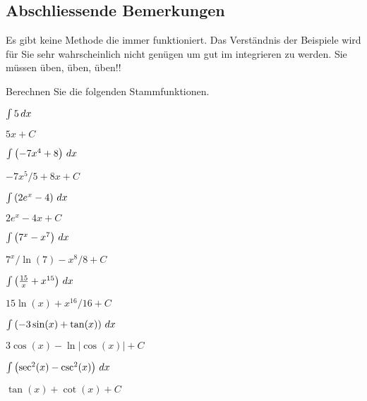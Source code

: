 \subsection*{Abschliessende Bemerkungen}

Es gibt keine Methode die immer funktioniert. Das Verständnis der Beispiele wird für Sie sehr wahrscheinlich nicht genügen um gut im integrieren zu werden. Sie müssen üben, üben, üben!!



\begin{exercises}
\noindent Berechnen Sie die folgenden Stammfunktionen.
\begin{multicols}{2}
\begin{exercise}
$\int 5\, d x$
\begin{answer}
$5x+C$
\end{answer}
\end{exercise}

\begin{exercise}
$\int \left(-7x^4+8\right)\, d x$
\begin{answer}
$-7x^5/5 +8x + C$
\end{answer}
\end{exercise}

\begin{exercise}
$\int \left(2e^x -4\right)\, d x$
\begin{answer}
$2e^x -4x + C$
\end{answer}
\end{exercise}

\begin{exercise}
$\int \left(7^x - x^7\right)\, d x$
\begin{answer}
$7^x/\ln(7) - x^8/8 +C$
\end{answer}
\end{exercise}


\begin{exercise}
$\int \left(\frac{15}{x}+x^{15}\right)\, d x$
\begin{answer}
$15\ln(x) + x^{16}/16 + C$
\end{answer}
\end{exercise}


\begin{exercise}
$\int \left(-3\sin(x) + \tan(x)\right)\, d x$
\begin{answer}
$3\cos(x) -\ln|\cos(x)|+C$
\end{answer}
\end{exercise}

\begin{exercise}
$\int \left(\sec^2(x) -\csc^2(x)\right) \, d x$
\begin{answer}
$\tan(x) + \cot(x) + C$
\end{answer}
\end{exercise}



\end{multicols}
\end{exercises}
